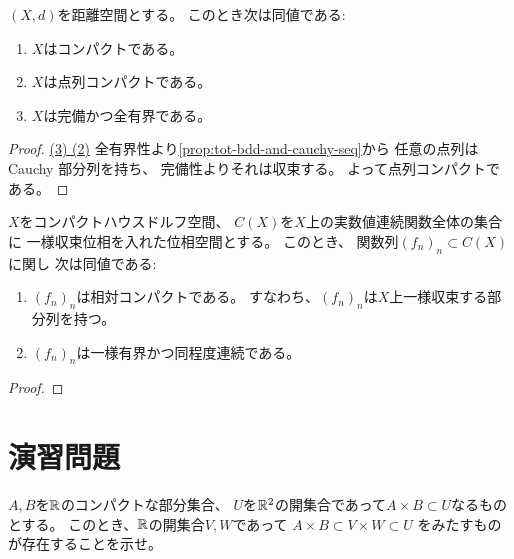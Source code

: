 \documentclass[report]{jlreq}
\begin{document}
\begin{theorem}[コンパクト空間の特徴づけ]
    $(X, d)$を距離空間とする。
    このとき次は同値である:
    \begin{enumerate}
        \item $X$はコンパクトである。
        \item $X$は点列コンパクトである。
        \item $X$は完備かつ全有界である。
    \end{enumerate}
\end{theorem}

\begin{proof}
    \uline{(3) \Rightarrow (2)} \quad
    全有界性より\cref{prop:tot-bdd-and-cauchy-seq}から
    任意の点列は Cauchy 部分列を持ち、
    完備性よりそれは収束する。
    よって点列コンパクトである。

    \TODO{}
\end{proof}

\begin{theorem}
    $X$をコンパクトハウスドルフ空間、
    $C(X)$を$X$上の実数値連続関数全体の集合に
    一様収束位相を入れた位相空間とする。
    このとき、
    関数列$( f_n )_n \subset C(X)$に関し
    次は同値である:
    \begin{enumerate}
        \item $(f_n)_n$は相対コンパクトである。
            すなわち、$(f_n)_n$は$X$上一様収束する部分列を持つ。
        \item $(f_n)_n$は一様有界かつ同程度連続である。
    \end{enumerate}
\end{theorem}

\begin{proof}
    \TODO{}
\end{proof}

%
\section{演習問題}

\begin{problem}[東大数理 2007A]
    $A, B$を$\mathbb{R}$のコンパクトな部分集合、
    $U$を$\mathbb{R}^2$の開集合であって$A \times B \subset U$なるものとする。
    このとき、$\mathbb{R}$の開集合$V, W$であって
    $A \times B \subset V \times W \subset U$
    をみたすものが存在することを示せ。
\end{problem}
\end{document}

